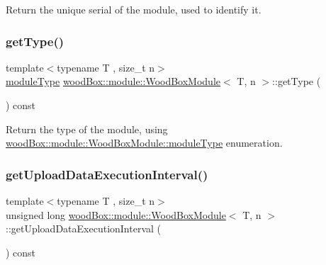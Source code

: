 Return the unique serial of the module, used to identify it. \mbox{\label{classwood_box_1_1module_1_1_wood_box_module_ab2507312ea013ea5c95b8e1731ddc81d}} 
\subsubsection{\texorpdfstring{get\+Type()}{getType()}}
{\footnotesize\ttfamily template$<$typename T , size\+\_\+t n$>$ \\
\mbox{\hyperlink{classwood_box_1_1module_1_1_wood_box_module_af74476c8a785de7fe587c4fb68435673}{module\+Type}} \mbox{\hyperlink{classwood_box_1_1module_1_1_wood_box_module}{wood\+Box\+::module\+::\+Wood\+Box\+Module}}$<$ T, n $>$\+::get\+Type (\begin{DoxyParamCaption}{ }\end{DoxyParamCaption}) const\hspace{0.3cm}{\ttfamily [inline]}}

Return the type of the module, using \mbox{\hyperlink{classwood_box_1_1module_1_1_wood_box_module_af74476c8a785de7fe587c4fb68435673}{wood\+Box\+::module\+::\+Wood\+Box\+Module\+::module\+Type}} enumeration. \mbox{\label{classwood_box_1_1module_1_1_wood_box_module_a9582f3340d1aa35abfe278dec41f4313}} 
\subsubsection{\texorpdfstring{get\+Upload\+Data\+Execution\+Interval()}{getUploadDataExecutionInterval()}}
{\footnotesize\ttfamily template$<$typename T , size\+\_\+t n$>$ \\
unsigned long \mbox{\hyperlink{classwood_box_1_1module_1_1_wood_box_module}{wood\+Box\+::module\+::\+Wood\+Box\+Module}}$<$ T, n $>$\+::get\+Upload\+Data\+Execution\+Interval (\begin{DoxyParamCaption}{ }\end{DoxyParamCaption}) const\hspace{0.3cm}{\ttfamily [inline]}}

